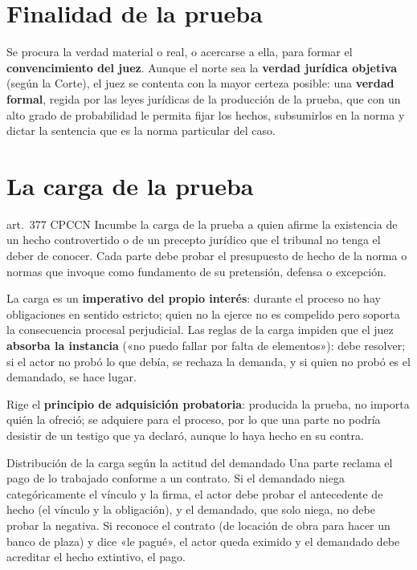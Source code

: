 \documentclass[12pt,oneside]{book}
\begin{document}
\section{Finalidad de la prueba}

Se procura la verdad material o real, o acercarse a ella, para formar el \textbf{convencimiento del juez}. Aunque el norte sea la \textbf{verdad jurídica objetiva} (según la Corte), el juez se contenta con la mayor certeza posible: una \textbf{verdad formal}, regida por las leyes jurídicas de la producción de la prueba, que con un alto grado de probabilidad le permita fijar los hechos, subsumirlos en la norma y dictar la sentencia que es la norma particular del caso.

\section{La carga de la prueba}

\begin{norma}{art.~377 CPCCN}
Incumbe la carga de la prueba a quien afirme la existencia de un hecho controvertido o de un precepto jurídico que el tribunal no tenga el deber de conocer. Cada parte debe probar el presupuesto de hecho de la norma o normas que invoque como fundamento de su pretensión, defensa o excepción.
\end{norma}

La carga es un \textbf{imperativo del propio interés}: durante el proceso no hay obligaciones en sentido estricto; quien no la ejerce no es compelido pero soporta la consecuencia procesal perjudicial. Las reglas de la carga impiden que el juez \textbf{absorba la instancia} («no puedo fallar por falta de elementos»): debe resolver; si el actor no probó lo que debía, se rechaza la demanda, y si quien no probó es el demandado, se hace lugar.

Rige el \textbf{principio de adquisición probatoria}: producida la prueba, no importa quién la ofreció; se adquiere para el proceso, por lo que una parte no podría desistir de un testigo que ya declaró, aunque lo haya hecho en su contra.

\begin{example}{Distribución de la carga según la actitud del demandado}
Una parte reclama el pago de lo trabajado conforme a un contrato. Si el demandado niega categóricamente el vínculo y la firma, el actor debe probar el antecedente de hecho (el vínculo y la obligación), y el demandado, que solo niega, no debe probar la negativa. Si reconoce el contrato (de locación de obra para hacer un banco de plaza) y dice «le pagué», el actor queda eximido y el demandado debe acreditar el hecho extintivo, el pago.
\end{example}
\end{document}
